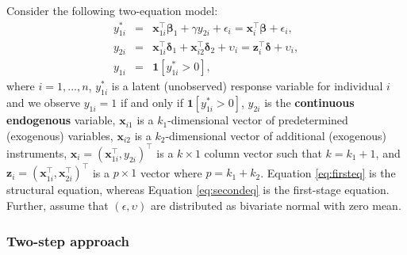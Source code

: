 Consider the following two-equation model:
\begin{eqnarray}
    y_{1i}^*  &= &  \mathbf x_{1i}^\top\boldsymbol \beta_{1} +  \gamma y_{2i} + \epsilon_{i} = \mathbf x_i^\top\boldsymbol \beta+ \epsilon_i,   \label{eq:firsteq}\\
    y_{2i}   & = & \mathbf x_{1i}^\top \boldsymbol \delta_1 + \mathbf x_{i2}^\top \boldsymbol \delta_2 + \upsilon_{i} = \mathbf z_i^\top\boldsymbol \delta+\upsilon_i, \label{eq:secondeq} \\
  y_{1i}   & = & \mathbf{1}\left[y_{1i}^* > 0\right], \label{eq:binassign}
\end{eqnarray}
where \(i = 1, ..., n\), \(y_{1i}^*\) is a latent (unobserved) response variable for individual \(i\) and we observe \(y_{1i} = 1\) if and only if \(\mathbf{1}\left[y_{1i}^* > 0\right]\), \(y_{2i}\) is the \textbf{continuous endogenous} variable, \(\mathbf x_{i1}\) is a \(k_1\)-dimensional vector of predetermined (exogenous) variables, \(\mathbf x_{i2}\) is a \(k_2\)-dimensional vector of additional (exogenous) instruments, \(\mathbf x_i = \left(\mathbf x_{1i}^\top, y_{2i}\right)^\top\) is a \(k\times 1\) column vector such that \(k = k_1 + 1\), and \(\mathbf z_i = \left(\mathbf x_{1i}^\top, \mathbf x_{2i}^\top\right)^\top\) is a \(p\times 1\) vector where \(p = k_1 + k_2\). Equation \eqref{eq:firsteq} is the structural equation, whereas Equation \eqref{eq:secondeq} is the first-stage equation. Further, assume that \((\epsilon, \upsilon)\) are distributed as bivariate normal with zero mean.

\hypertarget{two-step-approach}{%
\subsubsection{Two-step approach}\label{two-step-approach}}


